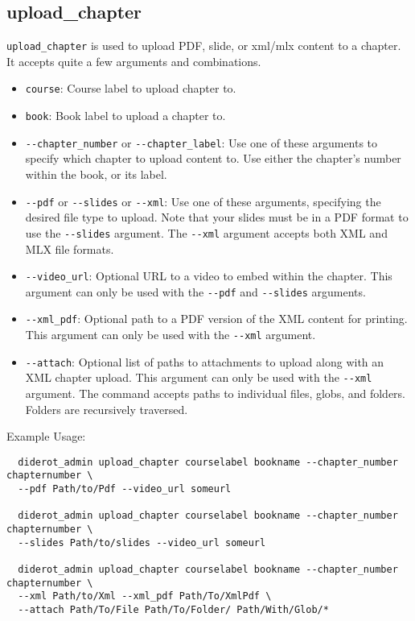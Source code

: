 \subsection{upload\_chapter}

\verb|upload_chapter| is used to upload PDF, slide, or xml/mlx content to a chapter.
%
It accepts quite a few arguments and combinations.

\begin{itemize}
  \item \verb|course|: Course label to upload chapter to.
  \item \verb|book|: Book label to upload a chapter to.

  \item \verb|--chapter_number| or \verb|--chapter_label|: Use one of these arguments to specify which chapter to upload content to. Use either the chapter's number within the book, or its label.

  \item \verb|--pdf| or \verb|--slides| or \verb|--xml|: Use one of these arguments, specifying the desired file type to upload. Note that your slides must be in a PDF format to use the \verb|--slides| argument. The \verb|--xml| argument accepts both XML and MLX file formats.

  \item \verb|--video_url|: Optional URL to a video to embed within the chapter. This argument can only be used with the \verb|--pdf| and \verb|--slides| arguments.

  \item \verb|--xml_pdf|: Optional path to a PDF version of the XML content for printing. This argument can only be used with the \verb|--xml| argument.

  \item \verb|--attach|: Optional list of paths to attachments to upload along with an XML chapter upload. This argument can only be used with the \verb|--xml| argument. The command accepts paths to individual files, globs, and folders. Folders are recursively traversed.
\end{itemize}

Example Usage:
\begin{verbatim}
  diderot_admin upload_chapter courselabel bookname --chapter_number chapternumber \
  --pdf Path/to/Pdf --video_url someurl

  diderot_admin upload_chapter courselabel bookname --chapter_number chapternumber \
  --slides Path/to/slides --video_url someurl

  diderot_admin upload_chapter courselabel bookname --chapter_number chapternumber \
  --xml Path/to/Xml --xml_pdf Path/To/XmlPdf \
  --attach Path/To/File Path/To/Folder/ Path/With/Glob/*
\end{verbatim}

